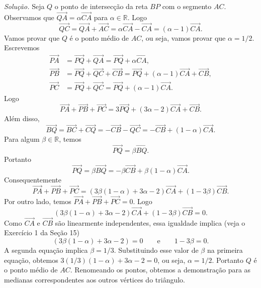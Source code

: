\documentclass[a4paper,11pt]{article}
\newcommand{\R}{\mathbb{R}}
\begin{document}
\vspace{\baselineskip}

\emph{Solução.}
Seja $Q$ o ponto de intersecção da reta $BP$ com o segmento $AC$.
Observamos que $\overrightarrow{QA} = \alpha \overrightarrow{CA}$ para $\alpha \in \R$.
Logo
\[
  \overrightarrow{QC} = \overrightarrow{QA} + \overrightarrow{AC} = \alpha \overrightarrow{CA} - \overrightarrow{CA} = (\alpha - 1) \overrightarrow{CA}.
\]
Vamos provar que $Q$ é o ponto médio de $AC$, ou seja, vamos provar que $\alpha = 1/2$.
Escrevemos
\begin{align*}
  \overrightarrow{PA} & = \overrightarrow{PQ} + \overrightarrow{QA} = \overrightarrow{PQ} + \alpha \overrightarrow{CA}, \\
  \overrightarrow{PB} & = \overrightarrow{PQ} + \overrightarrow{QC} + \overrightarrow{CB} = \overrightarrow{PQ} + (\alpha - 1) \overrightarrow{CA} + \overrightarrow{CB}, \\
  \overrightarrow{PC} & = \overrightarrow{PQ} + \overrightarrow{QC} = \overrightarrow{PQ} + (\alpha - 1) \overrightarrow{CA}.
\end{align*}
Logo
\[
  \overrightarrow{PA} + \overrightarrow{PB} + \overrightarrow{PC} = 3 \overrightarrow{PQ} + (3\alpha - 2) \overrightarrow{CA} + \overrightarrow{CB}.
\]
Além disso,
\[
  \overrightarrow{BQ} = \overrightarrow{BC} + \overrightarrow{CQ} = - \overrightarrow{CB} - \overrightarrow{QC} = - \overrightarrow{CB} + (1 - \alpha) \overrightarrow{CA}.
\]
Para algum $\beta \in \R$, temos
\[
  \overrightarrow{PQ} = \beta \overrightarrow{BQ}.
\]
Portanto
\[
  \overrightarrow{PQ} = \beta \overrightarrow{BQ} = - \beta \overrightarrow{CB} + \beta (1 - \alpha) \overrightarrow{CA}.
\]
Consequentemente
\[
  \overrightarrow{PA} + \overrightarrow{PB} + \overrightarrow{PC} = (3 \beta (1 - \alpha) + 3\alpha - 2) \overrightarrow{CA} + (1 - 3 \beta) \overrightarrow{CB}.
\]
Por outro lado, temos $\overrightarrow{PA} + \overrightarrow{PB} + \overrightarrow{PC} = 0$.
Logo
\[
  (3 \beta (1 - \alpha) + 3\alpha - 2) \overrightarrow{CA} + (1 - 3 \beta) \overrightarrow{CB} = 0.
\]
Como $\overrightarrow{CA}$ e $\overrightarrow{CB}$ são linearmente independentes, essa igualdade implica
(veja o Exercício 1 da Seção 15)
\[
  (3 \beta(1 - \alpha) + 3\alpha - 2) = 0 \qquad \text{e} \qquad 1 - 3 \beta = 0.
\]
A segunda equação implica $\beta = 1/3$.
Substituindo esse valor de $\beta$ na primeira equação, obtemos $3(1/3)(1 - \alpha) + 3\alpha - 2 = 0$, ou seja, $\alpha = 1/2$.
Portanto $Q$ é o ponto médio de $AC$.
Renomeando os pontos, obtemos a demonstração para as medianas correspondentes aos outros vértices do triângulo.
\end{document}
